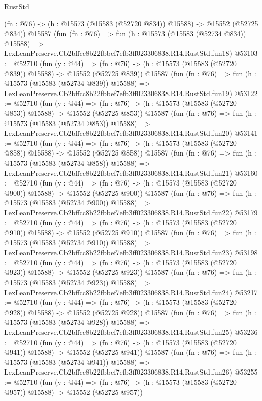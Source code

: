 \begin{lexlean}{RustStd}
\begin{coremodule}
    (fn : @76) -> (h : @15573 (@15583 (@52720 @834)) @15588) -> @15552 (@52725 @834))
    @15587
    (fun (fn : @76) =>
    fun (h : @15573 (@15583 (@52734 @834)) @15588) =>
    LexLeanPreserve.Cb2bffcc8b22fbbef7efb3ff023306838.R14.RustStd.fun18)
@53103 := @52710
    (fun (y : @44) =>
    (fn : @76) -> (h : @15573 (@15583 (@52720 @839)) @15588) -> @15552 (@52725 @839))
    @15587
    (fun (fn : @76) =>
    fun (h : @15573 (@15583 (@52734 @839)) @15588) =>
    LexLeanPreserve.Cb2bffcc8b22fbbef7efb3ff023306838.R14.RustStd.fun19)
@53122 := @52710
    (fun (y : @44) =>
    (fn : @76) -> (h : @15573 (@15583 (@52720 @853)) @15588) -> @15552 (@52725 @853))
    @15587
    (fun (fn : @76) =>
    fun (h : @15573 (@15583 (@52734 @853)) @15588) =>
    LexLeanPreserve.Cb2bffcc8b22fbbef7efb3ff023306838.R14.RustStd.fun20)
@53141 := @52710
    (fun (y : @44) =>
    (fn : @76) -> (h : @15573 (@15583 (@52720 @858)) @15588) -> @15552 (@52725 @858))
    @15587
    (fun (fn : @76) =>
    fun (h : @15573 (@15583 (@52734 @858)) @15588) =>
    LexLeanPreserve.Cb2bffcc8b22fbbef7efb3ff023306838.R14.RustStd.fun21)
@53160 := @52710
    (fun (y : @44) =>
    (fn : @76) -> (h : @15573 (@15583 (@52720 @900)) @15588) -> @15552 (@52725 @900))
    @15587
    (fun (fn : @76) =>
    fun (h : @15573 (@15583 (@52734 @900)) @15588) =>
    LexLeanPreserve.Cb2bffcc8b22fbbef7efb3ff023306838.R14.RustStd.fun22)
@53179 := @52710
    (fun (y : @44) =>
    (fn : @76) -> (h : @15573 (@15583 (@52720 @910)) @15588) -> @15552 (@52725 @910))
    @15587
    (fun (fn : @76) =>
    fun (h : @15573 (@15583 (@52734 @910)) @15588) =>
    LexLeanPreserve.Cb2bffcc8b22fbbef7efb3ff023306838.R14.RustStd.fun23)
@53198 := @52710
    (fun (y : @44) =>
    (fn : @76) -> (h : @15573 (@15583 (@52720 @923)) @15588) -> @15552 (@52725 @923))
    @15587
    (fun (fn : @76) =>
    fun (h : @15573 (@15583 (@52734 @923)) @15588) =>
    LexLeanPreserve.Cb2bffcc8b22fbbef7efb3ff023306838.R14.RustStd.fun24)
@53217 := @52710
    (fun (y : @44) =>
    (fn : @76) -> (h : @15573 (@15583 (@52720 @928)) @15588) -> @15552 (@52725 @928))
    @15587
    (fun (fn : @76) =>
    fun (h : @15573 (@15583 (@52734 @928)) @15588) =>
    LexLeanPreserve.Cb2bffcc8b22fbbef7efb3ff023306838.R14.RustStd.fun25)
@53236 := @52710
    (fun (y : @44) =>
    (fn : @76) -> (h : @15573 (@15583 (@52720 @941)) @15588) -> @15552 (@52725 @941))
    @15587
    (fun (fn : @76) =>
    fun (h : @15573 (@15583 (@52734 @941)) @15588) =>
    LexLeanPreserve.Cb2bffcc8b22fbbef7efb3ff023306838.R14.RustStd.fun26)
@53255 := @52710
    (fun (y : @44) =>
    (fn : @76) -> (h : @15573 (@15583 (@52720 @957)) @15588) -> @15552 (@52725 @957))

\end{coremodule}
\end{lexlean}
